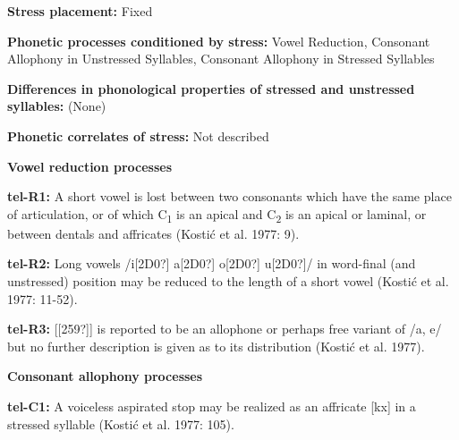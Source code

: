 \begin{styleBody}
\textbf{Stress placement:} Fixed
\end{styleBody}

\begin{styleBody}
\textbf{Phonetic processes conditioned by stress:} Vowel Reduction, Consonant Allophony in Unstressed Syllables, Consonant Allophony in Stressed Syllables
\end{styleBody}

\begin{styleBody}
\textbf{Differences in phonological properties of stressed and unstressed syllables:} (None)
\end{styleBody}

\begin{styleBody}
\textbf{Phonetic correlates of stress: }Not described
\end{styleBody}

\begin{styleBody}
\textbf{Vowel reduction processes}
\end{styleBody}

\begin{styleBody}
\textbf{tel-R1:} A short vowel is lost between two consonants which have the same place of articulation, or of which C\textsubscript{1} is an apical and C\textsubscript{2} is an apical or laminal, or between dentals and affricates (Kostić et al. 1977: 9).
\end{styleBody}

\begin{styleBody}
\textbf{tel-R2:} Long vowels /i[2D0?] a[2D0?] o[2D0?] u[2D0?]/ in word-final (and unstressed) position may be reduced to the length of a short vowel (Kostić et al. 1977: 11-52).
\end{styleBody}

\begin{styleBody}
\textbf{tel-R3:} [[259?]] is reported to be an allophone or perhaps free variant of /a, e/ but no further description is given as to its distribution (Kostić et al. 1977).
\end{styleBody}

\begin{styleBody}
\textbf{Consonant allophony processes}
\end{styleBody}

\begin{styleBody}
\textbf{tel-C1: }A voiceless aspirated stop may be realized as an affricate [kx] in a stressed syllable (Kostić et al. 1977: 105).
\end{styleBody}

